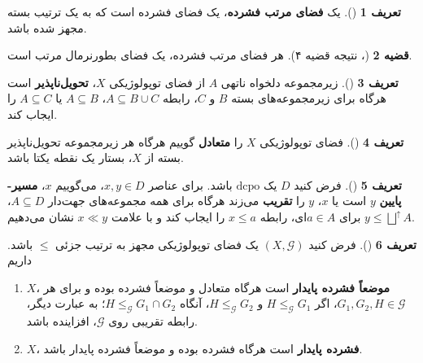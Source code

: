 \documentclass[12pt,a4paper]{article}
\theoremstyle{definition}
\newtheorem{definition}{تعریف}[section]
\theoremstyle{theorem}
\newtheorem{theorem}[definition]{قضیه}
\theoremstyle{definition}
\newcommand{\cG}{\mathcal{G}}
\begin{document}
\begin{definition}[\cite{Nachbin}]
یک 
\textbf{فضای مرتب فشرده}،
یک فضای فشرده است که به یک ترتیب بسته مجهز شده باشد.

\end{definition}
\begin{theorem}[\cite{Nachbin}، نتیجه قضیه ۴]\label{mf} 
هر فضای مرتب فشرده،  یک فضای بطورنرمال مرتب است.

\end{theorem}
\begin{definition}[\cite{Alvarez2}]
زیرمجموعه دلخواه ناتهی  $ A $ از فضای توپولوژیکی $ X $،   \textbf{تحویل‌ناپذیر} است
 هرگاه برای زیرمجموعه‌های بسته $ B $ و $ C $،  رابطه $ A\subseteq B\cup C $،  $ A\subseteq B $ یا $ A\subseteq C $ را ایجاب کند.
\end{definition}
\begin{definition}[\cite{Alvarez2}]
فضای توپولوژیکی 
$ X $
را 
 \textbf{متعادل}
 گوییم هرگاه هر زیرمجموعه تحویل‌ناپذیر بسته از $  X$،  بستار یک نقطه یکتا باشد.
\end{definition}
\begin{definition}[\cite{Alvarez2}]
فرض کنید 
$ D $
یک 
$ \mathrm{dcpo} $
باشد.   برای عناصر $x,y\in D$،  می‌گوییم $ x $،  
\linebreak
\textbf{مسیر-پایین}
 $ y $ است یا $ x$،  $ y $ را\textbf{ تقریب}
  می‌زند هرگاه برای همه مجموعه‌های جهت‌دار
 $ A\subseteq D $،  $ y\leq \bigsqcup^{\uparrow}A $ 
  برای $  a\in A$ای،  رابطه $x\leq a  $ را ایجاب کند و با علامت $ x\ll y $ 
  نشان می‌دهیم. 
\end{definition}
\begin{definition}[\cite{Alvarez2}]
فرض کنید 
$(X,\cG)  $
 یک فضای توپولوژیکی مجهز به ترتیب جزئی
$ \leq $
   باشد.  داریم
\begin{enumerate}
\item 
$  X$،  \textbf{موضعاً فشرده پایدار} است هرگاه 
متعادل و موضعاً فشرده بوده و برای هر $ G_{1},G_{2},H\in \cG $، اگر  $ H\leq_{\cG}G _{1} $ و $ H\leq_{\cG}G_{2} $،  آنگاه $ H\leq_{\cG}G_{1}\cap G_{2} $؛  به عبارت دیگر، رابطه تقریبی روی $ \cG $،  افزاینده باشد. 
\item
$ X $،  \textbf{فشرده پایدار} است هرگاه 
فشرده بوده و موضعاً فشرده پایدار باشد.
\end{enumerate}

\end{definition}
\end{document}
